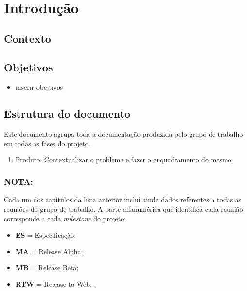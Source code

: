 
\chapter{Introdução}


\section{Contexto}



\section{Objetivos}


\begin{itemize}
	\item inserir obejtivos

\end{itemize}

\clearpage

\section{Estrutura do documento}
Este documento agrupa toda a documentação produzida pelo grupo de trabalho em todas as fases do projeto.

\begin{enumerate}
	\item Produto. Contextualizar o problema e fazer o enquadramento do mesmo;

\end{enumerate}

\subsection*{\textbf{NOTA}:}

Cada um dos capítulos da lista anterior inclui ainda dados referentes a todas as reuniões do grupo de trabalho. A parte alfanumérica que identifica cada reunião corresponde a cada \textit{milestone} do projeto:
\begin{itemize}
	\item \textbf{ES} = Especificação;
	\item \textbf{MA} = Release Alpha;
	\item \textbf{MB} = Release Beta;
	\item \textbf{RTW} = Release to Web. . 
\end{itemize}

\newpage

